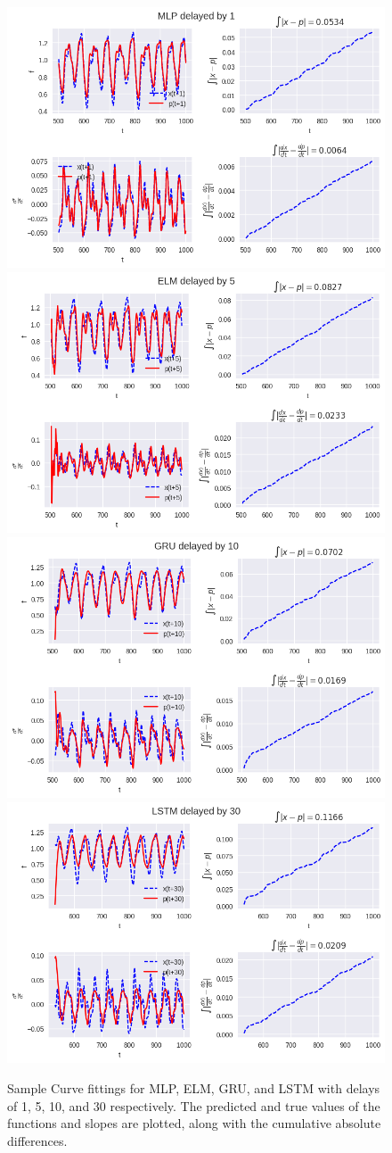 \documentclass[11pt]{article}
\begin{document}
 \begin{figure}
   \begin{center}
   \includegraphics[width=.48\textwidth]{figures/MLP_1.png}
   \includegraphics[width=.48\textwidth]{figures/ELM_5.png}
   \includegraphics[width=.48\textwidth]{figures/GRU_10.png}
   \includegraphics[width=.48\textwidth]{figures/LSTM_30.png}
 \end{center}
 \caption{Sample Curve fittings for MLP, ELM, GRU, and LSTM with
   delays of 1, 5, 10, and 30 respectively. The predicted and true
   values of the functions and slopes are plotted, along with the
   cumulative absolute differences.}
 \label{fig:func_evals}
   \end{figure}
\end{document}
